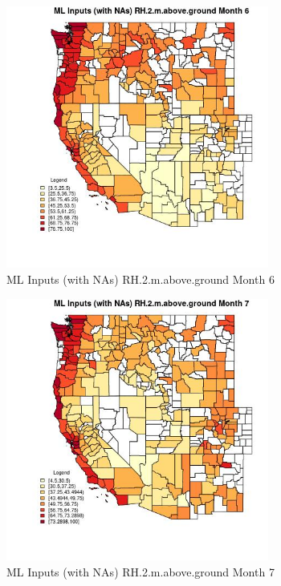 \begin{figure} 
\centering  
\includegraphics[width=0.77\textwidth]{Code_Outputs/Report_ML_input_PM25_Step4_part_f_de_duplicated_aves_prioritize_24hr_obswNAs_CountyRH2mabovegroundmedianMonth6.jpg} 
\caption{\label{fig:Report_ML_input_PM25_Step4_part_f_de_duplicated_aves_prioritize_24hr_obswNAsCountyRH2mabovegroundmedianMonth6}ML Inputs (with NAs) RH.2.m.above.ground Month 6} 
\end{figure} 
 

\begin{figure} 
\centering  
\includegraphics[width=0.77\textwidth]{Code_Outputs/Report_ML_input_PM25_Step4_part_f_de_duplicated_aves_prioritize_24hr_obswNAs_CountyRH2mabovegroundmedianMonth7.jpg} 
\caption{\label{fig:Report_ML_input_PM25_Step4_part_f_de_duplicated_aves_prioritize_24hr_obswNAsCountyRH2mabovegroundmedianMonth7}ML Inputs (with NAs) RH.2.m.above.ground Month 7} 
\end{figure} 
 

